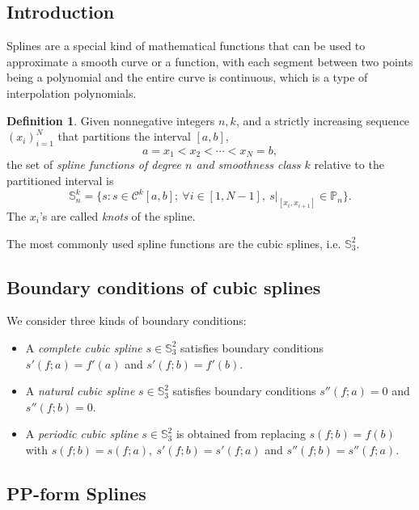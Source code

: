 \documentclass[a4paper]{article}
\theoremstyle{definition}
\newtheorem{definition}{Definition}
\begin{document}
\subsection{Introduction}

Splines are a special kind of mathematical functions that can be used to approximate a smooth curve or a function, with each segment between two points being a polynomial and the entire curve is continuous, which is a type of interpolation polynomials. 

\begin{definition}
  Given nonnegative integers $n, k$, and a strictly increasing sequence $(x_i)_{i = 1}^N$ that partitions the interval $[a, b]$, 
  \begin{equation}
    a = x_1 < x_2 < \cdots < x_N = b,
    \label{eq:partition}
  \end{equation}
  the set of \textit{spline functions of degree $n$ and smoothness class $k$} relative to the partitioned interval is 
  \begin{equation}
    \mathbb{S}_n^k = \{s: s \in \mathcal{C}^k[a, b];\ \forall i \in [1, N - 1],\ s\big|_{[x_i, x_{i + 1}]} \in \mathbb{P}_n\}.
    \label{eq:spline-set}
  \end{equation}
  The $x_i$'s are called \textit{knots} of the spline.
\end{definition}

The most commonly used spline functions are the cubic splines, i.e. $\mathbb{S}_3^2$.

\subsection{Boundary conditions of cubic splines}

We consider three kinds of boundary conditions:
\begin{itemize}
  \item A \textit{complete cubic spline} $s \in \mathbb{S}_3^2$ satisfies boundary conditions $s'(f; a) = f'(a)$ and $s'(f; b) = f'(b)$.
  \item A \textit{natural cubic spline} $s \in \mathbb{S}_3^2$ satisfies boundary conditions $s''(f; a) = 0$ and $s''(f; b) = 0$.
  \item A \textit{periodic cubic spline} $s \in \mathbb{S}_3^2$ is obtained from replacing $s(f; b) = f(b)$ with $s(f; b) = s(f; a),\ s'(f; b) = s'(f; a)$ and $s''(f; b) = s''(f; a)$.
\end{itemize}

\subsection{PP-form Splines}
\label{sec:pp-form-splines}
\end{document}
